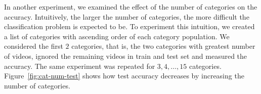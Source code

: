 In another experiment, we examined the effect of the number of categories on the accuracy. Intuitively, the larger the number of categories, the more difficult the classification problem is expected to be. To experiment this intuition, we created a list of categories with ascending order of each category population. We considered the first $2$ categories, that is, the two categories with greatest number of videos, ignored the remaining videos in train and test set and measured the accuracy. The same experiment was repeated for $3, 4, \ldots, 15$ categories.
Figure~\ref{fig:cat-num-test} shows how test accuracy decreases by increasing the number of categories.